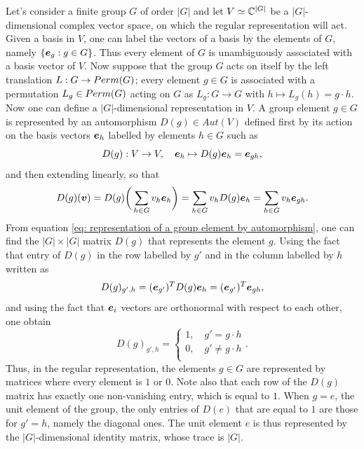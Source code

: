 Let's consider a finite group $G$ of order $|G|$ and let $V \simeq \mathbb{C}^{|G|}$ be a $|G|$-dimensional complex vector space, on which the regular representation will act. Given a basis in $V$, one can label the vectors of a basis by the elements of $G$, namely $\{\bm{e}_g : g \in G\}$. Thus every element of $G$ is unambiguously associated with a basis vector of $V$. Now suppose that the group $G$ acts on itself by the left translation $L : G \to {Perm}(G)$; every element $g \in G$ is associated with a permutation $L_g \in {Perm}(G)$ acting on $G$ as $L_g : G \to G$ with $h \mapsto L_g(h) = g\cdot h$. Now one can define a $|G|$-dimensional representation in $V$. A group element $g \in G$ is represented by an automorphism $D(g) \in Aut(V)$ defined first by its action on the basis vectors $\bm{e}_h$ labelled by elements $h \in G$ such as
\begin{equation}
\label{eq: representation of a group element by automorphism}
    D(g) : V \to V,\quad \bm{e}_h \mapsto D(g)\bm{e}_h = \bm{e}_{gh},
\end{equation}
and then extending linearly, so that 
\begin{equation}
    D(g)(\bm{v}) = D(g)\bigg(\sum_{h \in G}v_h\bm{e}_h\bigg) = \sum_{h \in G}v_hD(g)\bm{e}_h = \sum_{h \in G}v_h\bm{e}_{gh}.
\end{equation}
From equation \eqref{eq: representation of a group element by automorphism}, one can find the $|G| \times |G|$ matrix $D(g)$ that represents the element $g$. Using the fact that entry of $D(g)$ in the row labelled by $g'$ and in the column labelled by $h$ written as
\begin{equation}
    D(g)_{g',h} = (\bm{e}_{g'})^TD(g)\bm{e}_h = (\bm{e}_{g'})^T\bm{e}_{gh},
\end{equation}
and using the fact that $\bm{e}_i$ vectors are orthonormal with respect to each other, one obtain
\begin{equation}
    D(g)_{g',h} =
    \begin{cases}
        1,\quad g' = g \cdot h \\
        0,\quad g' \neq g \cdot h \\
    \end{cases}.
\end{equation}
Thus, in the regular representation, the elements $g \in G$ are represented by matrices where every element is $1$ or $0$. Note also that each row of the $D(g)$ matrix has exactly one non-vanishing entry, which is equal to $1$. When $g = e$, the unit element of the group, the only entries of $D(e)$ that are equal to $1$ are those for $g' = h$, namely the diagonal ones. The unit element $e$ is thus represented by the $|G|$-dimensional identity matrix, whose trace is $|G|$. 

